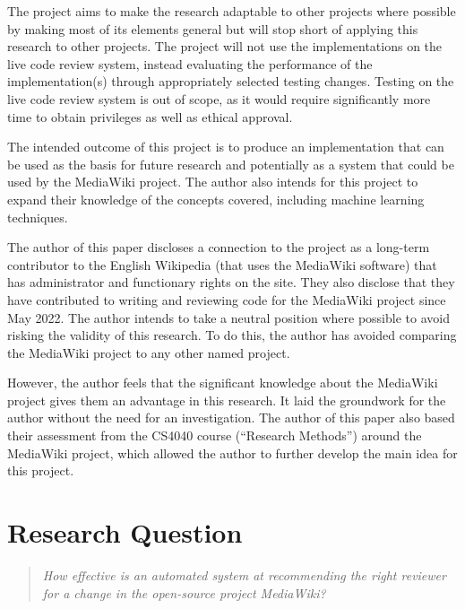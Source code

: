 The project aims to make the research adaptable to other projects where possible by making most of its elements general but will stop short of applying this research to other projects. The project will not use the implementations on the live code review system, instead evaluating the performance of the implementation(s) through appropriately selected testing changes. Testing on the live code review system is out of scope, as it would require significantly more time to obtain privileges as well as ethical approval.

The intended outcome of this project is to produce an implementation that can be used as the basis for future research and potentially as a system that could be used by the MediaWiki project. The author also intends for this project to expand their knowledge of the concepts covered, including machine learning techniques.

The author of this paper discloses a connection to the project as a long-term contributor to the English Wikipedia (that uses the MediaWiki software) that has administrator and functionary rights on the site. They also disclose that they have contributed to writing and reviewing code for the MediaWiki project since May 2022. The author intends to take a neutral position where possible to avoid risking the validity of this research. To do this, the author has avoided comparing the MediaWiki project to any other named project.

However, the author feels that the significant knowledge about the MediaWiki project gives them an advantage in this research. It laid the groundwork for the author without the need for an investigation. The author of this paper also based their assessment from the CS4040 course (``Research Methods'') around the MediaWiki project, which allowed the author to further develop the main idea for this project.

\section{Research Question\label{section:research-question}}

\begin{quote}
    \begin{center}\Large{\textit{How effective is an automated system at recommending the right reviewer for a change in the open-source project MediaWiki?}}\end{center}
\end{quote}

